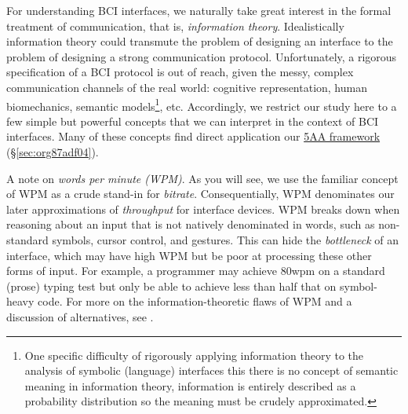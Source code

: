 \documentclass[logo,bsc,singlespacing,parskip]{infthesis}
\begin{document}
For understanding BCI interfaces, we naturally take great interest in the formal treatment of communication, that is, \emph{information theory}.
Idealistically information theory could transmute the problem of designing an interface to the problem of designing a strong communication protocol.
Unfortunately, a rigorous specification of a BCI protocol is out of reach, given the messy, complex communication channels of the real world: cognitive representation, human biomechanics, semantic models\footnote{One specific difficulty of rigorously applying information theory to the analysis of symbolic (language) interfaces this there is no concept of semantic meaning in information theory, information is entirely described as a probability distribution so the meaning must be crudely approximated.}, etc.
Accordingly, we restrict our study here to a few simple but powerful concepts that we can interpret in the context of BCI interfaces.
Many of these concepts find direct application our \hyperref[sec:org87adf04]{5AA framework} (\S \ref{sec:org87adf04}).

A note on \emph{words per minute (WPM)}.
As you will see, we use the familiar concept of WPM as a crude stand-in for \emph{bitrate}.
Consequentially, WPM denominates our later approximations of \emph{throughput} for interface devices.
WPM breaks down when reasoning about an input that is not natively denominated in words, such as non-standard symbols, cursor control, and gestures.
This can hide the \emph{bottleneck} of an interface, which may have high WPM but be poor at processing these other forms of input.
For example, a programmer may achieve 80wpm on a standard (prose) typing test but only be able to achieve less than half that on symbol-heavy code.
For more on the information-theoretic flaws of WPM and a discussion of alternatives, see \autocite[pp. 57]{liuInformationTheoryUnified}.
\end{document}
